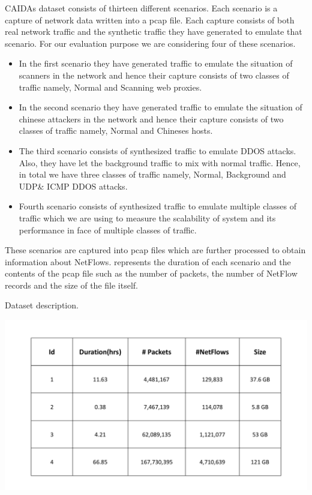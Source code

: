 CAIDAs dataset consists of thirteen different scenarios. Each scenario is a capture of network data written into a pcap file. Each capture consists of both real network traffic and the synthetic traffic they have generated to emulate that scenario. For our evaluation purpose we are considering four of these scenarios.

\begin{itemize}
	\item In the first scenario they have generated traffic to emulate the situation of scanners in the network and hence their capture consists of two classes of traffic namely,  Normal and Scanning web proxies.
	\item In the second scenario they have generated traffic to emulate the situation of chinese attackers in the network and hence their capture consists of two classes of traffic namely, Normal and Chineses hosts.
	\item The third scenario consists of synthesized traffic to emulate DDOS attacks. Also, they have let the background traffic to mix with normal traffic. Hence, in total we have three classes of traffic namely, Normal, Background and UDP\& ICMP DDOS attacks.
	\item Fourth scenario consists of synthesized traffic to emulate multiple classes of traffic which we are using to measure the scalability of system and its performance in face of multiple classes of traffic. 

\end{itemize}

 These scenarios are captured into pcap files which are further processed to obtain information about NetFlows.  represents the duration of each scenario and the contents of the pcap file such as the number of packets, the number of NetFlow records and the size of the file itself.
 
 
 \begin{table}[b]
 	\caption{Dataset description.}%
 	\centerline{\includegraphics[scale = 0.5]{synth_desc.pdf}}	
 \end{table}

